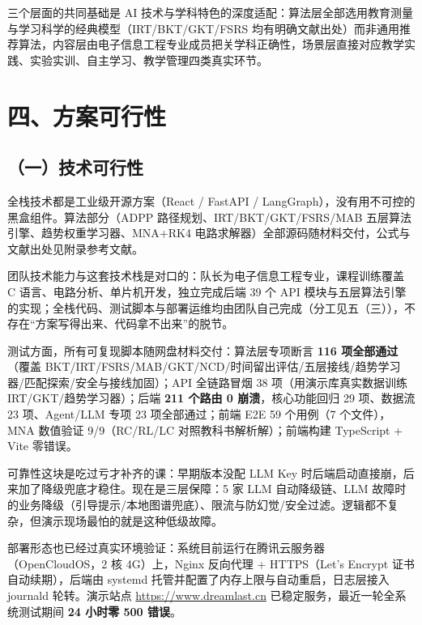 \documentclass[zihao=-4,a4paper,UTF8,fontset=windows]{ctexart}
\begin{document}
三个层面的共同基础是 AI 技术与学科特色的深度适配：算法层全部选用教育测量与学习科学的经典模型（IRT/BKT/GKT/FSRS 均有明确文献出处）而非通用推荐算法，内容层由电子信息工程专业成员把关学科正确性，场景层直接对应教学实践、实验实训、自主学习、教学管理四类真实环节。

\section{四、方案可行性}
\subsection{（一）技术可行性}


全栈技术都是工业级开源方案（React / FastAPI / LangGraph），没有用不可控的黑盒组件。算法部分（ADPP 路径规划、IRT/BKT/GKT/FSRS/MAB 五层算法引擎、趋势权重学习器、MNA+RK4 电路求解器）全部源码随材料交付，公式与文献出处见附录参考文献。



团队技术能力与这套技术栈是对口的：队长为电子信息工程专业，课程训练覆盖 C 语言、电路分析、单片机开发，独立完成后端 39 个 API 模块与五层算法引擎的实现；全栈代码、测试脚本与部署运维均由团队自己完成（分工见五（三）），不存在“方案写得出来、代码拿不出来”的脱节。



测试方面，所有可复现脚本随网盘材料交付：算法层专项断言 \textbf{116 项全部通过}（覆盖 BKT/IRT/FSRS/MAB/GKT/NCD/时间留出评估/五层接线/趋势学习器/匹配探索/安全与接线加固）；API 全链路冒烟 38 项（用演示库真实数据训练 IRT/GKT/趋势学习器）；后端 \textbf{211 个路由 0 崩溃}，核心功能回归 29 项、数据流 23 项、Agent/LLM 专项 23 项全部通过；前端 E2E 59 个用例（7 个文件），MNA 数值验证 9/9（RC/RL/LC 对照教科书解析解）；前端构建 TypeScript + Vite 零错误。



可靠性这块是吃过亏才补齐的课：早期版本没配 LLM Key 时后端启动直接崩，后来加了降级兜底才稳住。现在是三层保障：5 家 LLM 自动降级链、LLM 故障时的业务降级（引导提示/本地图谱兜底）、限流与防幻觉/安全过滤。逻辑都不复杂，但演示现场最怕的就是这种低级故障。



部署形态也已经过真实环境验证：系统目前运行在腾讯云服务器（OpenCloudOS，2 核 4G）上，Nginx 反向代理 + HTTPS（Let's Encrypt 证书自动续期），后端由 systemd 托管并配置了内存上限与自动重启，日志层接入 journald 轮转。演示站点 \url{https://www.dreamlast.cn} 已稳定服务，最近一轮全系统测试期间 \textbf{24 小时零 500 错误}。
\end{document}
